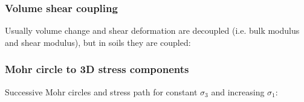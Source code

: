 \documentclass[notes]{beamer}
\begin{document}
\begin{frame}
\frametitle{Volume shear coupling}
Usually volume change and shear deformation are decoupled (i.e. bulk modulus and shear modulus), but in soils they are coupled:
\end{frame}

\begin{frame}
\frametitle{Mohr circle to 3D stress components}
Successive Mohr circles and stress path for constant $\sigma_3$ and increasing $\sigma_1$:
\end{frame}
\end{document}
